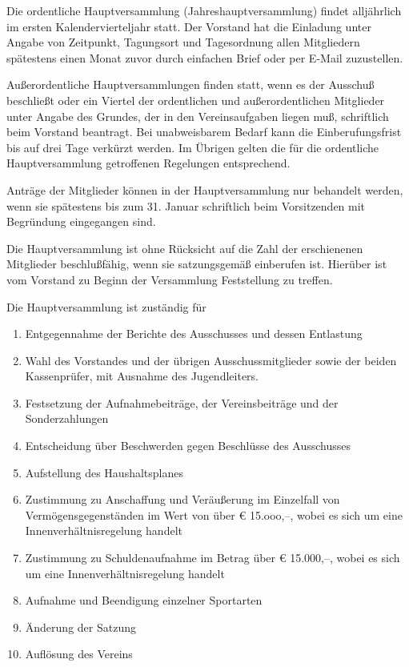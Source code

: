 \documentclass[10pt,a4paper,parskip=half]{scrartcl}
\begin{document}
\begin{contract}
\begin{multicols}{2}
    Die ordentliche Hauptversammlung (Jahreshauptversammlung) findet alljährlich im ersten Kalendervierteljahr statt.
    Der Vorstand hat die Einladung unter Angabe von Zeitpunkt,
    Tagungsort und Tagesordnung allen Mitgliedern spätestens einen Monat zuvor durch einfachen Brief oder per E-Mail zuzustellen.
    
    Außerordentliche Hauptversammlungen finden statt,
    wenn es der Ausschuß beschließt oder ein Viertel der ordentlichen und außerordentlichen Mitglieder unter Angabe des Grundes,
    der in den Vereinsaufgaben liegen muß,
    schriftlich beim Vorstand beantragt.
    Bei unabweisbarem Bedarf kann die Einberufungsfrist bis auf drei Tage verkürzt werden.
    Im Übrigen gelten die für die ordentliche Hauptversammlung getroffenen Regelungen entsprechend.
    
    Anträge der Mitglieder können in der Haupt\-ver\-samm\-lung nur behandelt werden,
    wenn sie spätestens bis zum 31. Januar schriftlich beim Vorsitzenden mit Begründung eingegangen sind.
    
    Die Hauptversammlung ist ohne Rücksicht auf die Zahl der erschienenen Mitglieder beschlußfähig,
    wenn sie satzungsgemäß einberufen ist.
    Hierüber ist vom Vorstand zu Beginn der Versammlung Feststellung zu treffen.
    
    Die Hauptversammlung ist zuständig für
    \begin{enumerate}[label=\alph*),noitemsep]
      \item Entgegennahme der Berichte des Ausschusses und dessen Entlastung
      \item Wahl des Vorstandes und der übrigen Ausschussmitglieder sowie der beiden Kassenprüfer,
            mit Ausnahme des Jugendleiters.
      \item Festsetzung der Aufnahmebeiträge,
            der Vereinsbeiträge und der Sonderzahlungen
      \item Entscheidung über Beschwerden gegen Beschlüsse des Ausschusses
      \item Aufstellung des Haushaltsplanes
      \item Zustimmung zu Anschaffung und Veräußerung im Einzelfall von Vermögensgegenständen im Wert von über € 15.ooo,--,
            wobei es sich um eine Innenverhältnisregelung handelt
      \item Zustimmung zu Schuldenaufnahme im Betrag über € 15.000,--,
            wobei es sich um eine Innenverhältnisregelung handelt
      \item Aufnahme und Beendigung einzelner Sportarten
      \item Änderung der Satzung
      \item Auflösung des Vereins
    \end{enumerate}
    

\end{multicols}
\end{contract}
\end{document}

